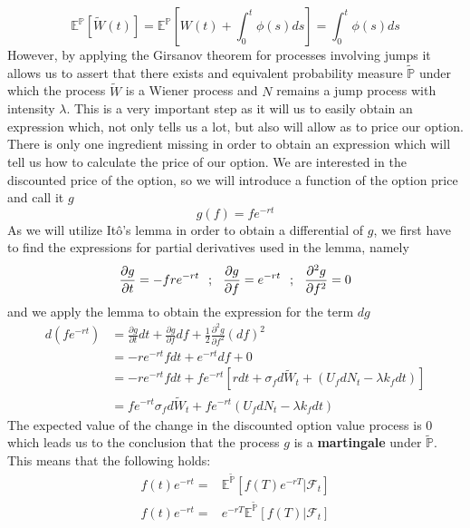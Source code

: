 \documentclass[times, utf8, diplomski]{fer}
\begin{document}
\begin{equation*}
	\mathbb{E}^{\mathbb{P}}[\tilde{W}(t)] = \mathbb{E}^{\mathbb{P}}[W(t) + \int_0^t \phi(s) ds] = \int_0^t \phi(s) ds
\end{equation*}
However, by applying the Girsanov theorem for processes involving jumps it allows us to assert that there exists and equivalent probability measure $\tilde{\mathbb{P}}$ under which the process $\tilde{W}$ is a Wiener process and $N$ remains a jump process with intensity $\lambda$. This is a very important step as it will us to easily obtain an expression which, not only tells us a lot, but also will allow as to price our option. There is only one ingredient missing in order to obtain an expression which will tell us how to calculate the price of our option. We are interested in the discounted price of the option, so we will introduce a function of the option price and call it $g$ $$ g(f) =  fe^{-rt} $$ As we will utilize It\^{o}'s lemma in order to obtain a differential of $g$, we first have to find the expressions for partial derivatives used in the lemma, namely
$$
	\frac{\partial g}{\partial t} = -fre^{-rt} \hspace{0.25cm} ; \hspace{0.25cm} \frac{\partial g}{\partial f} = e^{-rt} \hspace{0.25cm} ; \hspace{0.25cm} \frac{\partial^2 g}{\partial f^2} = 0
$$
and we apply the lemma to obtain the expression for the term $dg$
\begin{align*}
	d(fe^{-rt}) &= \frac{\partial g}{\partial t}dt + \frac{\partial g}{\partial f}df + \frac{1}{2}\frac{\partial^2 g}{\partial f^2}(df)^2 \\
				&= -re^{-rt}fdt + e^{-rt}df + 0 \\
				&= -re^{-rt}fdt + fe^{-rt}[r dt + \sigma_f d\tilde{W}_t + (U_fdN_t - \lambda k_f dt)] \\
				&= fe^{-rt}\sigma_f d\tilde{W}_t + fe^{-rt}(U_fdN_t-\lambda k_f dt)
\end{align*}
The expected value of the change in the discounted option value process is $0$ which leads us to the conclusion that the process $g$ is a \textbf{martingale} under $\tilde{\mathbb{P}}$. This means that the following holds: 
\begin{equation*}
	\begin{split}
		f(t)e^{-rt} =& \mathbb{E}^{\tilde{\mathbb{P}}}[f(T)e^{-rT}|\mathcal{F}_t]\\
		f(t)e^{-rt} =& e^{-rT}\mathbb{E}^{\tilde{\mathbb{P}}}[f(T)|\mathcal{F}_t]
	\end{split}	
\end{equation*}
\end{document}
